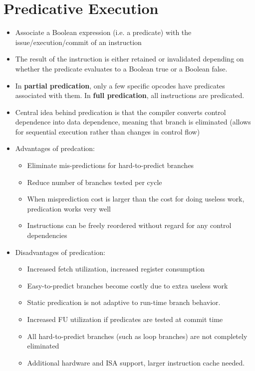 \documentclass{article}
\begin{document}
\section{Predicative Execution}
\begin{itemize}
    \item Associate a Boolean expression (i.e. a predicate) with the issue/execution/commit of an instruction
    
    \item The result of the instruction is either retained or invalidated depending on whether the predicate evaluates to a Boolean true or a Boolean false. 
    
    \item In \textbf{partial predication}, only a few specific opcodes have predicates associated with them. In \textbf{full predication}, all instructions are predicated.
    
    \item Central idea behind predication is that the compiler converts control dependence into data dependence, meaning that branch is eliminated (allows for sequential execution rather than changes in control flow)
    
    \item Advantages of predcation:
    \begin{itemize}
        \item Eliminate mis-predictions for hard-to-predict branches
        
        \item Reduce number of branches tested per cycle
        
        \item When misprediction cost is larger than the cost for doing useless work, predication works very well
        
        \item Instructions can be freely reordered without regard for any control dependencies
    \end{itemize}
    
    \item Disadvantages of predication:
    \begin{itemize}
        \item Increased fetch utilization, increased register consumption
        
        \item Easy-to-predict branches become costly due to extra useless work
        
        \item Static predication is not adaptive to run-time branch behavior.
        
        \item Increased FU utilization if predicates are tested at commit time
        
        \item All hard-to-predict branches (such as loop branches) are not completely eliminated
        
        \item Additional hardware and ISA support, larger instruction cache needed. 
    \end{itemize}
\end{itemize}
\end{document}
